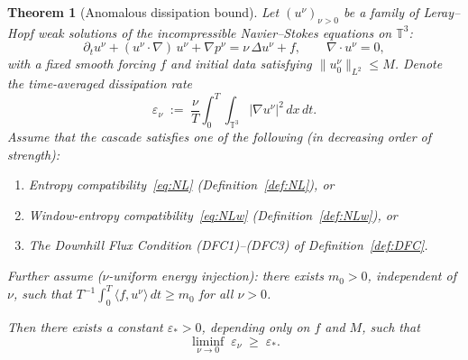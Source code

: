 \documentclass[12pt,a4paper]{article}
\theoremstyle{definition}
\theoremstyle{plain}
\newtheorem{theorem}[definition]{Theorem}
\theoremstyle{remark}
\begin{document}
\begin{theorem}[Anomalous dissipation bound]\label{thm:anomalous}
Let $(u^\nu)_{\nu > 0}$ be a family of Leray--Hopf weak solutions of the
incompressible Navier--Stokes equations on $\mathbb{T}^3$:
\begin{equation}\label{eq:NSE}
  \partial_t u^\nu + (u^\nu \cdot \nabla)\,u^\nu
  + \nabla p^\nu
  = \nu\,\Delta u^\nu + f,
  \qquad \nabla \cdot u^\nu = 0,
\end{equation}
with a fixed smooth forcing $f$ and initial data satisfying
$\|u^\nu_0\|_{L^2} \le M$.  Denote the time-averaged dissipation rate
\begin{equation}\label{eq:diss}
  \varepsilon_\nu
  \;:=\;
  \frac{\nu}{T} \int_0^T \!\!\int_{\mathbb{T}^3}
    |\nabla u^\nu|^2 \,dx\,dt.
\end{equation}
Assume that the cascade satisfies \emph{one} of the following
(in decreasing order of strength):
\begin{enumerate}
  \item[\textup{(H1)}] Entropy compatibility~\eqref{eq:NL}
    (Definition~\ref{def:NL}), or
  \item[\textup{(H2)}] Window-entropy compatibility~\eqref{eq:NLw}
    (Definition~\ref{def:NLw}), or
  \item[\textup{(H3)}] The Downhill Flux Condition
    \textup{(DFC1)--(DFC3)} of Definition~\ref{def:DFC}.
\end{enumerate}
Further assume \textup{($\nu$-uniform energy injection)}:
there exists $m_0 > 0$, independent of $\nu$, such that
$T^{-1}\int_0^T \langle f, u^\nu \rangle\,dt \ge m_0$
for all $\nu > 0$.

Then there exists a constant $\varepsilon_* > 0$, depending only on $f$
and $M$, such that
\begin{equation}\label{eq:anomalous}
  \liminf_{\nu \to 0}\; \varepsilon_\nu
  \;\ge\; \varepsilon_*.
\end{equation}
\end{theorem}
\end{document}

